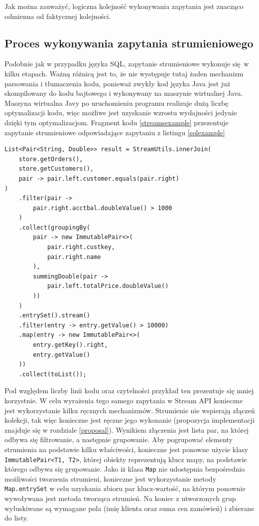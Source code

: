 \documentclass[12pt]{extarticle}
\begin{document}
Jak można zauważyć, logiczna kolejność wykonywania zapytania jest znacząco odmienna od faktycznej kolejności.

\subsection{Proces wykonywania zapytania strumieniowego}

    Podobnie jak w przypadku języka SQL, zapytanie strumieniowe wykonuje się w kilku etapach. Ważną różnicą jest to, że nie występuje tutaj żaden mechanizm parsowania i tłumaczenia kodu, ponieważ zwykły kod języka Java jest już skompilowany do kodu bajtowego i wykonywany na maszynie wirtualnej Java. Maszyna wirtualna Javy po uruchomieniu programu realizuje dużą liczbę optymalizacji kodu, więc możliwe jest uzyskanie wzrostu wydajności jedynie dzięki tym optymalizacjom. Fragment kodu \ref{streamsexample} przezentuje zapytanie strumieniowe odpowiadające zapytaniu z listingu \ref{sqlexample}

\begin{lstlisting}[label=streamsexample, caption=Analogiczne rozwiązanie wykorzystujące Stream API]
List<Pair<String, Double>> result = StreamUtils.innerJoin(
    store.getOrders(),
    store.getCustomers(),
    pair -> pair.left.customer.equals(pair.right)
)
    .filter(pair ->
        pair.right.acctbal.doubleValue() > 1000
    )
    .collect(groupingBy(
        pair -> new ImmutablePair<>(
            pair.right.custkey,
            pair.right.name
        ),
        summingDouble(pair ->
            pair.left.totalPrice.doubleValue()
        ))
    )
    .entrySet().stream()
    .filter(entry -> entry.getValue() > 10000)
    .map(entry -> new ImmutablePair<>(
        entry.getKey().right,
        entry.getValue()
    ))
    .collect(toList());
\end{lstlisting}

    Pod względem liczby linii kodu oraz czytelności przykład ten prezentuje się mniej korzystnie. W celu wyrażenia tego samego zapytania w Stream API konieczne jest wykorzystanie kilku ręcznych mechanizmów. Strumienie nie wspierają złączeń kolekcji, tak więc konieczne jest ręczne jego wykonanie (propozycja implementacji znajduje się w rozdziale \ref{proposal}). Wynikiem złączenia jest lista par, na której odbywa się filtrowanie, a następnie grupowanie. Aby pogrupować elementy strumienia na podstawie kilku właściwości, konieczne jest ponowne użycie klasy \texttt{ImmutablePair<T1, T2>}, której obiekty reprezentują klucz mapy, na podstawie którego odbywa się grupowanie. Jako iż klasa \texttt{Map} nie udostępnia bezpośrednio możliwości tworzenia strumieni, konieczne jest wykorzystanie metody \texttt{Map.entrySet} w celu uzyskania zbioru par klucz-wartość, na którym ponownie wywoływana jest metoda tworząca strumień. Na koniec z utworzonych grup wyłuskiwane są wymagane pola (imię klienta oraz suma cen zamówień) i zbierane do listy.
\end{document}
